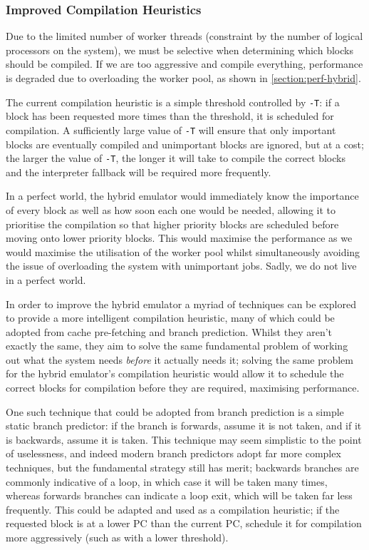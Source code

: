 \subsubsection{Improved Compilation Heuristics}
\label{section:further-hybrid}

Due to the limited number of worker threads (constraint by the number of logical processors on the system), we must be selective when determining which blocks should be compiled. If we are too aggressive and compile everything, performance is degraded due to overloading the worker pool, as shown in \autoref{section:perf-hybrid}.

The current compilation heuristic is a simple threshold controlled by \texttt{-T}: if a block has been requested more times than the threshold, it is scheduled for compilation. A sufficiently large value of \texttt{-T} will ensure that only important blocks are eventually compiled and unimportant blocks are ignored, but at a cost; the larger the value of \texttt{-T}, the longer it will take to compile the correct blocks and the interpreter fallback will be required more frequently.

In a perfect world, the hybrid emulator would immediately know the importance of every block as well as how soon each one would be needed, allowing it to prioritise the compilation so that higher priority blocks are scheduled before moving onto lower priority blocks. This would maximise the performance as we would maximise the utilisation of the worker pool whilst simultaneously avoiding the issue of overloading the system with unimportant jobs. Sadly, we do not live in a perfect world.

In order to improve the hybrid emulator a myriad of techniques can be explored to provide a more intelligent compilation heuristic, many of which could be adopted from cache pre-fetching and branch prediction. Whilst they aren't exactly the same, they aim to solve the same fundamental problem of working out what the system needs \textit{before} it actually needs it; solving the same problem for the hybrid emulator's compilation heuristic would allow it to schedule the correct blocks for compilation before they are required, maximising performance.

One such technique that could be adopted from branch prediction is a simple static branch predictor: if the branch is forwards, assume it is not taken, and if it is backwards, assume it is taken. This technique may seem simplistic to the point of uselessness, and indeed modern branch predictors adopt far more complex techniques, but the fundamental strategy still has merit; backwards branches are commonly indicative of a loop, in which case it will be taken many times, whereas forwards branches can indicate a loop exit, which will be taken far less frequently. This could be adapted and used as a compilation heuristic; if the requested block is at a lower PC than the current PC, schedule it for compilation more aggressively (such as with a lower threshold).